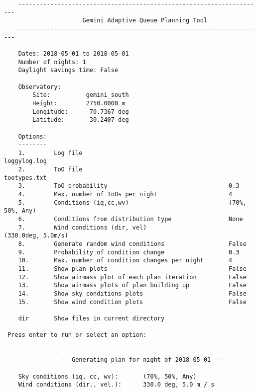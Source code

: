 \documentclass{article}
\begin{document}
\begin{lstlisting}
	---------------------------------------------------------------------
	                  Gemini Adaptive Queue Planning Tool
	---------------------------------------------------------------------
	
	Dates: 2018-05-01 to 2018-05-01
	Number of nights: 1
	Daylight savings time: False
	
	Observatory: 
		Site:          gemini_south
		Height:        2750.0000 m
		Longitude:     -70.7367 deg
		Latitude:      -30.2407 deg

	Options:
	--------
	1.        Log file                                         loggylog.log                            
	2.        ToO file                                         tootypes.txt                            
	3.        ToO probability                                  0.3                                     
	4.        Max. number of ToOs per night                    4                                       
	5.        Conditions (iq,cc,wv)                            (70%, 50%, Any)                         
	6.        Conditions from distribution type                None                                    
	7.        Wind conditions (dir, vel)                       (330.0deg, 5.0m/s)                      
	8.        Generate random wind conditions                  False                                   
	9.        Probability of condition change                  0.3                                     
	10.       Max. number of condition changes per night       4                                       
	11.       Show plan plots                                  False                                   
	12.       Show airmass plot of each plan iteration         False                                   
	13.       Show airmass plots of plan building up           False                                   
	14.       Show sky conditions plots                        False                                   
	15.       Show wind condition plots                        False                                   

	dir       Show files in current directory                                                      

 Press enter to run or select an option: 


				-- Generating plan for night of 2018-05-01 --
	
	Sky conditions (iq, cc, wv):       (70%, 50%, Any)
	Wind conditions (dir., vel.):      330.0 deg, 5.0 m / s
	

\end{lstlisting}
\end{document}
